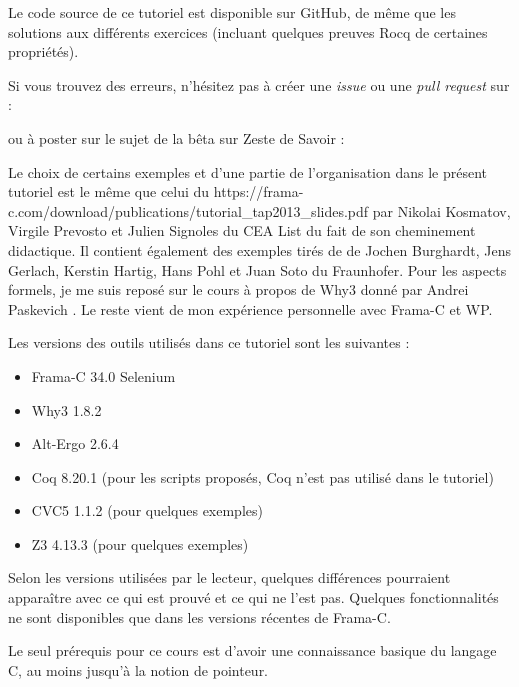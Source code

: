 \begin{Warning}
  Le code source de ce
  tutoriel est disponible sur GitHub, de même que les solutions aux
  différents exercices (incluant quelques preuves Rocq de certaines
  propriétés).

  Si vous trouvez des erreurs, n'hésitez pas à créer une \textit{issue} ou
  une \textit{pull request} sur :


  ou à poster sur le sujet de la bêta sur Zeste de Savoir :

\end{Warning}

\begin{Information}
Le choix de certains exemples et d'une partie de l'organisation dans le présent
tutoriel est le même que celui du
             {https://frama-c.com/download/publications/tutorial_tap2013_slides.pdf}
par Nikolai Kosmatov, Virgile Prevosto et Julien Signoles du CEA List du fait de
son cheminement didactique. Il contient également des exemples tirés de
\textit{}
de Jochen Burghardt, Jens Gerlach, Kerstin Hartig, Hans Pohl et Juan Soto du
Fraunhofer. Pour les aspects formels, je me suis reposé sur le cours
à propos de Why3 donné par Andrei Paskevich
\textit{}.
Le reste vient de mon expérience personnelle avec Frama-C et WP.

\horizontalLine

Les versions des outils utilisés dans ce tutoriel sont les suivantes :
\begin{itemize}
\item Frama-C 34.0 Selenium
\item Why3 1.8.2
\item Alt-Ergo 2.6.4
\item Coq 8.20.1 (pour les scripts proposés, Coq n'est pas utilisé dans le tutoriel)
\item CVC5 1.1.2 (pour quelques exemples)
\item Z3 4.13.3 (pour quelques exemples)
\end{itemize}
Selon les versions utilisées par le lecteur, quelques différences pourraient
apparaître avec ce qui est prouvé et ce qui ne l'est pas. Quelques fonctionnalités
ne sont disponibles que dans les versions récentes de Frama-C.

\horizontalLine

Le seul prérequis pour ce cours est d'avoir une connaissance basique du
langage C, au moins jusqu'à la notion de pointeur.


\end{Information}

